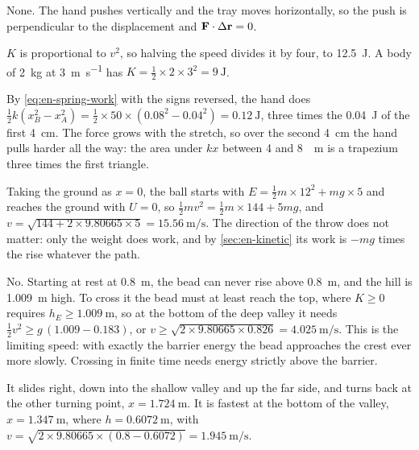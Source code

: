 \label{sec:en-answers}

None. The hand pushes vertically and the tray
moves horizontally, so the push is perpendicular to the displacement and
$\bm{\mathrm{F}}\cdot\Delta\bm{\mathrm{r}} = 0$.

$K$ is proportional to $v^2$, so halving the
speed divides it by four, to \SI{12.5}{\joule}. A body of
\SI{2}{\kilogram} at \SI{3}{\metre\per\second} has $K = \frac12\times2
\times3^2 = \SI{9}{\joule}$.

By \cref{eq:en-spring-work} with the signs
reversed, the hand does $\frac12 k(x_B^2 - x_A^2) = \frac12\times50\times
(0.08^2 - 0.04^2) = \SI{0.12}{\joule}$, three times the
\SI{0.04}{\joule} of the first \SI{4}{\centi\metre}. The force grows with
the stretch, so over the second \SI{4}{\centi\metre} the hand pulls
harder all the way: the area under $kx$ between 4 and \SI{8}{\centi
\metre} is a trapezium three times the first triangle.

Taking the ground as $x = 0$, the ball starts
with $E = \frac12 m\times12^2 + mg\times5$ and reaches the ground with $U
= 0$, so $\frac12 mv^2 = \frac12 m\times144 + 5mg$, and $v = \sqrt{144 +
2\times9.80665\times5} = \SI{15.56}{\metre\per\second}$. The direction of
the throw does not matter: only the weight does work, and by
\cref{sec:en-kinetic} its work is $-mg$ times the rise whatever the path.

No. Starting at rest at \SI{0.8}{\metre}, the bead
can never rise above \SI{0.8}{\metre}, and the hill is
\SI{1.009}{\metre} high. To cross it the bead must at least reach the
top, where $K \ge 0$ requires $h_E \ge \SI{1.009}{\metre}$, so at the
bottom of the deep valley it needs
$\frac12 v^2 \ge g\,(1.009 - 0.183)$, or $v \ge \sqrt{2\times9.80665\times
0.826} = \SI{4.025}{\metre\per\second}$. This is the limiting speed:
with exactly the barrier energy the bead approaches the crest ever more
slowly. Crossing in finite time needs energy strictly above the barrier.

It slides right, down into the shallow valley
and up the far side, and turns back at the other turning point, $x =
\SI{1.724}{\metre}$. It is fastest at the bottom of the valley, $x =
\SI{1.347}{\metre}$, where $h = \SI{0.6072}{\metre}$, with $v =
\sqrt{2\times9.80665\times(0.8 - 0.6072)} = \SI{1.945}{\metre\per
\second}$.

